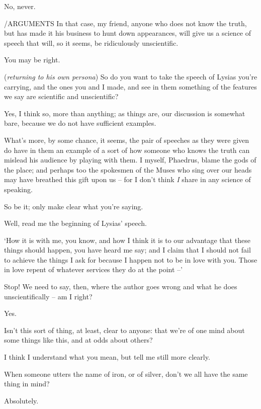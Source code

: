 No, never.

 /ARGUMENTS In that case, my friend, anyone who does not
know the truth, but has made it his business to hunt down appearances,
will give us a science of speech that will, so it seems, be ridiculously
unscientific.

You may be right.

 ({\em returning to his own persona}) So do you want to
take the speech of Lysias you're carrying, and the ones you and I
made, and see in them
something of the features we say are scientific and unscientific?

Yes, I think so, more than anything; as things are, our
discussion is somewhat bare, because we do not have sufficient examples.

 What's more, by some chance, it seems, the pair of
 speeches as
they were given do have in them an example of a sort of how someone who
knows the truth can mislead his audience by playing with
them. I myself,
Phaedrus, blame the gods of the place; and perhaps too the spokesmen of
the Muses  who sing over our heads may have breathed this gift
upon us -- for I don't think {\em I} share in any science of speaking.

So be it; only make clear what you're saying.

Well, read me the beginning of Lysias' speech.

 ‘How it is with me, you know, and how I think it is to
our advantage that these things should happen, you have heard me say;
and I claim that I should not fail to achieve the things I ask for
because I happen not to be in love with you. Those in love repent of
whatever services they do at the point --'

 Stop! We need to say, then, where the author goes
wrong and what he does unscientifically -- am I right?

 Yes.

Isn't this sort of thing, at least, clear to anyone: that we're
of one mind about some things like this, and at odds about others?

 I think I understand what you mean, but tell me still
more clearly.

When someone utters the name of iron, or of silver, don't we
all have the same thing in mind?

Absolutely.

